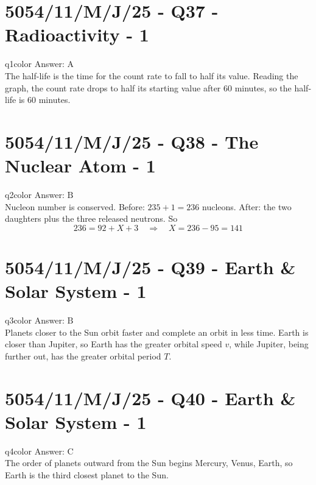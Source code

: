 \documentclass[11pt,a4paper]{article}
\newcommand{\examq}[4]{\section[#1 - Q#2]{#1 - Q#2 - #3 - #4}}
\begin{document}
\examq{5054/11/M/J/25}{37}{Radioactivity}{1}

\begin{ansbox}{q1color}
Answer: $\boxed{\text{A}}$\\[4pt]
The half-life is the time for the count rate to fall to half its value. Reading the graph, the count rate drops to half its starting value after $60$ minutes, so the half-life is $60$ minutes.
\end{ansbox}

\examq{5054/11/M/J/25}{38}{The Nuclear Atom}{1}

\begin{ansbox}{q2color}
Answer: $\boxed{\text{B}}$\\[4pt]
Nucleon number is conserved. Before: $235 + 1 = 236$ nucleons. After: the two daughters plus the three released neutrons. So
\[
236 = 92 + X + 3 \quad\Rightarrow\quad X = 236 - 95 = \boxed{141}
\]
\end{ansbox}

\examq{5054/11/M/J/25}{39}{Earth \& Solar System}{1}

\begin{ansbox}{q3color}
Answer: $\boxed{\text{B}}$\\[4pt]
Planets closer to the Sun orbit faster and complete an orbit in less time. Earth is closer than Jupiter, so Earth has the greater orbital speed $v$, while Jupiter, being further out, has the greater orbital period $T$.
\end{ansbox}

\examq{5054/11/M/J/25}{40}{Earth \& Solar System}{1}

\begin{ansbox}{q4color}
Answer: $\boxed{\text{C}}$\\[4pt]
The order of planets outward from the Sun begins Mercury, Venus, Earth, so Earth is the third closest planet to the Sun.
\end{ansbox}
\end{document}
